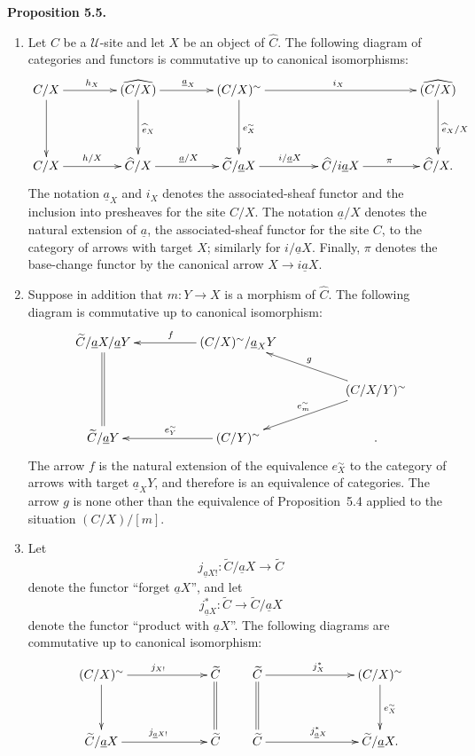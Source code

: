 \documentclass[11pt]{article}
\newcommand{\U}{\mathcal{U}}
\newenvironment{statement}[1]{\par\medskip\noindent\textbf{#1.}\ }{\par\medskip}
\begin{document}
\begin{statement}{Proposition 5.5}
\begin{enumerate}[label=\arabic*)]
\item Let \(C\) be a \(\U\)-site and let \(X\) be an object of \(\widehat C\). The following diagram of categories and functors is commutative up to canonical isomorphisms:
\[
\xymatrix@C=1.5cm@R=1.5cm{
C/X\ar[r]^{h_X}\ar[d]& \widehat{(C/X)}\ar[d]^{\widehat e_X}\ar[r]^{\underline a_X}& (C/X)^{\sim}\ar[rr]^{i_X}\ar[d]^{e_X^{\sim}}& &\widehat{(C/X)}\ar[d]^{\widehat e_X/X}\\
C/X\ar[r]^{h/X}& \widehat C/X\ar[r]^{\underline a/X}& \widetilde C/\underline aX\ar[r]^{i/\underline aX}& \widehat C/i\underline aX\ar[r]^{\pi}& \widehat C/X.
}
\]
The notation \(\underline a_X\) and \(i_X\) denotes the associated-sheaf functor and the inclusion into presheaves for the site \(C/X\). The notation \(\underline a/X\) denotes the natural extension of \(\underline a\), the associated-sheaf functor for the site \(C\), to the category of arrows with target \(X\); similarly for \(i/\underline aX\). Finally, \(\pi\) denotes the base-change functor by the canonical arrow \(X\to i\underline aX\).

\item Suppose in addition that \(m:Y\to X\) is a morphism of \(\widehat C\). The following diagram is commutative up to canonical isomorphism:
\[
\xymatrix@C=1.75cm@R=.75cm{
\widetilde C/\underline aX/\underline aY\ar@{=}[dd]& (C/X)^{\sim}/\underline a_XY\ar[l]_{f}& \\
& & (C/X/Y)^{\sim}\ar[lu]_{g}\ar[ld]_{e_m^{\sim}}\\
\widetilde C/\underline aY& (C/Y)^{\sim}\ar[l]_{e_Y^{\sim}}& .
}
\]
The arrow \(f\) is the natural extension of the equivalence \(e_X^{\sim}\) to the category of arrows with target \(\underline a_XY\), and therefore is an equivalence of categories. The arrow \(g\) is none other than the equivalence of Proposition~5.4 applied to the situation \((C/X)/[m]\).

\item Let
\[
j_{\underline aX!}:\widetilde C/\underline aX\to\widetilde C
\]
denote the functor ``forget \(\underline aX\)'', and let
\[
j_{\underline aX}^{\ast}:\widetilde C\to\widetilde C/\underline aX
\]
denote the functor ``product with \(\underline aX\)''. The following diagrams are commutative up to canonical isomorphism:
\[
\xymatrix@C=2.25cm@R=1.25cm{
(C/X)^{\sim}\ar[r]^{j_{X!}}\ar[d]& \widetilde C\ar@{=}[d]\\
\widetilde C/\underline aX\ar[r]^{j_{\underline aX!}}& \widetilde C
}
\qquad
\xymatrix@C=2.5cm@R=1.25cm{
\widetilde C\ar[r]^{j_X^{\ast}}\ar@{=}[d]& (C/X)^{\sim}\ar[d]^{e_X^{\sim}}\\
\widetilde C\ar[r]^{j_{\underline aX}^{\ast}}& \widetilde C/\underline aX.
}
\]
\end{enumerate}
\end{statement}
\end{document}
